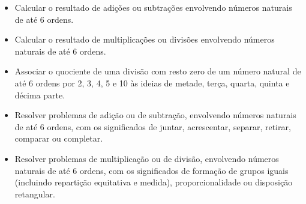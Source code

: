\begin{itemize}
    \item Calcular o resultado de adições ou subtrações envolvendo números
naturais de até 6 ordens.

    \item Calcular o resultado de multiplicações ou divisões envolvendo números
naturais de até 6 ordens.

    \item Associar o quociente de uma divisão com resto zero de um número
natural de até 6 ordens por 2, 3, 4, 5 e 10 às ideias de metade, terça,
quarta, quinta e décima parte.

    \item Resolver problemas de adição ou de subtração, envolvendo números
naturais de até 6 ordens, com os significados de juntar, acrescentar,
separar, retirar, comparar ou completar.

    \item Resolver problemas de multiplicação ou de divisão, envolvendo números
naturais de até 6 ordens, com os significados de formação de grupos
iguais (incluindo repartição equitativa e medida), proporcionalidade ou
disposição retangular.
\end{itemize}


